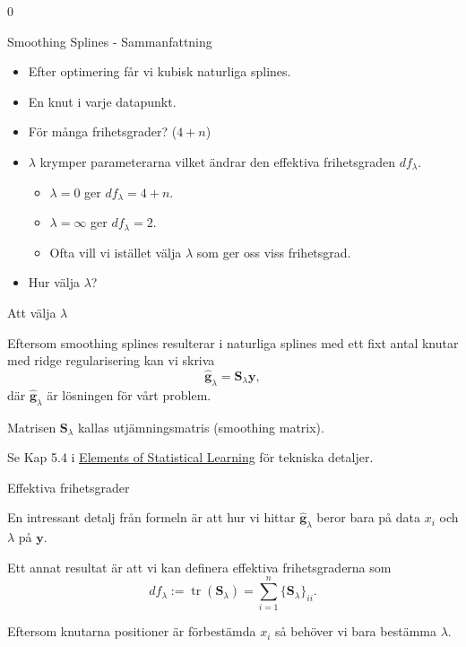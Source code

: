 0\documentclass[10pt,english]{beamer}
\begin{document}
\begin{frame}{Smoothing Splines - Sammanfattning}

    \begin{itemize}
        \item Efter optimering får vi kubisk naturliga splines.
        \item En knut i varje datapunkt.
        \item För många frihetsgrader? ($4+n$)
        \item $\lambda$ krymper parameterarna vilket ändrar den effektiva frihetsgraden $df_{\lambda}$.
        \begin{itemize}
            \item $\lambda = 0$ ger $df_{\lambda} = 4+n$.
            \item $\lambda = \infty$ ger $df_{\lambda} = 2$.
            \item Ofta vill vi istället välja $\lambda$ som ger oss viss frihetsgrad.
        \end{itemize}
        \item Hur välja $\lambda$?
    \end{itemize}
    
\end{frame}

\begin{frame}{Att välja $\lambda$}
    
    Eftersom smoothing splines resulterar i naturliga splines med ett fixt antal knutar med ridge regularisering kan vi skriva
    \begin{equation*}
        \hat{\mathbf{g}}_{\lambda} = \mathbf{S}_{\lambda} \mathbf{y},
    \end{equation*}
    där $\hat{\mathbf{g}}_{\lambda}$ är lösningen för vårt problem.

    Matrisen $\mathbf{S}_{\lambda}$ kallas utjämningsmatris (smoothing matrix).

    Se Kap 5.4 i \href{https://hastie.su.domains/ElemStatLearn/}{Elements of Statistical Learning} för tekniska detaljer.

\end{frame}

\begin{frame}{Effektiva frihetsgrader}

    En intressant detalj från formeln är att hur vi hittar $\hat{\mathbf{g}}_{\lambda}$ beror bara på data $x_i$ och $\lambda$  på $\mathbf{y}$.

    Ett annat resultat är att vi kan definera effektiva frihetsgraderna som
    \begin{equation*}
        df_{\lambda} := \operatorname{tr}(\mathbf{S}_{\lambda}) = \sum_{i=1}^{n} \{\mathbf{S}_{\lambda}\}_{ii}.
    \end{equation*}

    Eftersom knutarna positioner är förbestämda $x_i$ så behöver vi bara bestämma $\lambda$.

\end{frame}
\end{document}
